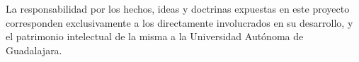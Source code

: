 
La responsabilidad por los hechos, ideas y doctrinas expuestas en este proyecto corresponden exclusivamente a los directamente involucrados en su desarrollo, y el patrimonio intelectual de la misma a la Universidad Autónoma de Guadalajara.